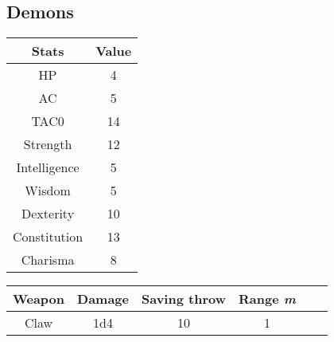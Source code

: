 \subsection{Demons}
\begin{table}[H]
  \centering
  \begin{tabular}{|c|c|}
    \hline
    \rowcolor[HTML]{C0C0C0}
    \textbf{Stats} & \textbf{Value} \\ \hline
    HP & 4 \\ \hline
    AC & 5 \\ \hline
    TAC0 & 14 \\ \hline
    Strength & 12 \\ \hline
    Intelligence & 5 \\ \hline
    Wisdom & 5  \\ \hline
    Dexterity & 10 \\ \hline
    Constitution & 13 \\ \hline
    Charisma & 8 \\ \hline
  \end{tabular}
\end{table}
\begin{table}[H]
  \centering
  \begin{tabular}{lll|c|c|c|}
    \hline
    \rowcolor[HTML]{C0C0C0}
    \textbf{Weapon} & \textbf{Damage} &\textbf{Saving throw}& \textbf{Range \textit{m}} \\ \hline
    \multicolumn{1}{|c|}{Claw} & \multicolumn{1}{c|}{1d4} &\multicolumn{1}{c|}{10}& \multicolumn{1}{c|}{1} \\ \hline
  \end{tabular}
\end{table}

